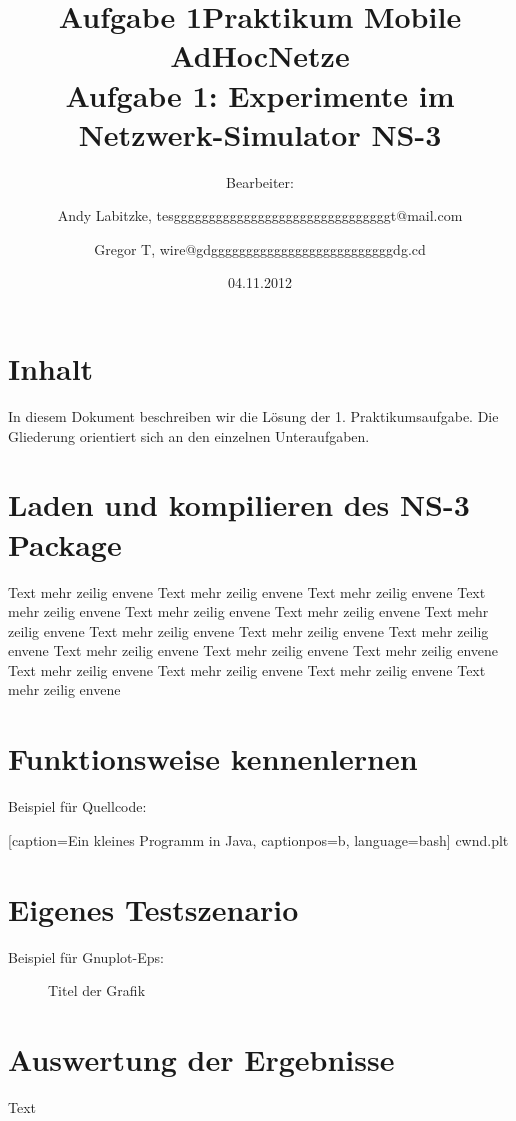 \documentclass[12pt,a4paper,titlepage]{article}
\title{Aufgabe 1}
\begin{document}
\title{Praktikum Mobile AdHocNetze\\
	Aufgabe 1: Experimente im Netzwerk-Simulator NS-3}
\author{
Bearbeiter: \and
	Andy Labitzke, tesgggggggggggggggggggggggggggggggt@mail.com \and 
	Gregor T, wire@gdggggggggggggggggggggggggggdg.cd}
\date{04.11.2012}
\maketitle
\setcounter{page}{1}
\appendix

\section*{Inhalt}
In diesem Dokument beschreiben wir die Lösung der 1. Praktikumsaufgabe. Die Gliederung orientiert sich an den einzelnen Unteraufgaben.

\setcounter{section}{0}

\section{Laden und kompilieren des NS-3 Package}

Text mehr zeilig envene Text mehr zeilig envene Text mehr zeilig envene Text mehr zeilig envene Text mehr zeilig envene Text mehr zeilig envene Text mehr zeilig envene Text mehr zeilig envene Text mehr zeilig envene Text mehr zeilig envene Text mehr zeilig envene Text mehr zeilig envene Text mehr zeilig envene Text mehr zeilig envene Text mehr zeilig envene Text mehr zeilig envene Text mehr zeilig envene 

\section{Funktionsweise kennenlernen}

Beispiel für Quellcode:


	[caption={Ein kleines Programm in Java}\label{lst:javaclass}, %
		captionpos=b,
		language=bash] %
	{cwnd.plt}
 
 


\section{Eigenes Testszenario}

Beispiel für Gnuplot-Eps:

\begin{figure}[h]
	\centering
	
	\caption{Titel der Grafik}
	\label{labelname}
\end{figure}



\section{Auswertung der Ergebnisse}

Text
\end{document}

